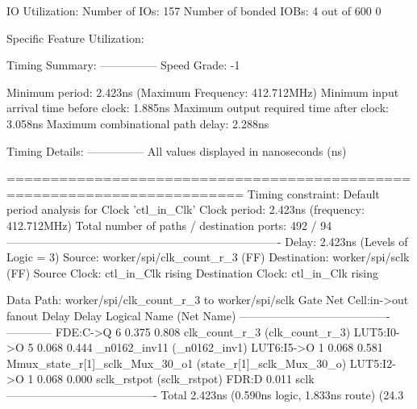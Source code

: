 \documentclass{article}
\begin{document}
IO Utilization: 
 Number of IOs:                         157
 Number of bonded IOBs:                   4  out of    600     0%

Specific Feature Utilization:

\fi
\iffalse
Timing Summary:
---------------
Speed Grade: -1

   Minimum period: 2.423ns (Maximum Frequency: 412.712MHz)
   Minimum input arrival time before clock: 1.885ns
   Maximum output required time after clock: 3.058ns
   Maximum combinational path delay: 2.288ns

Timing Details:
---------------
All values displayed in nanoseconds (ns)

=========================================================================
Timing constraint: Default period analysis for Clock 'ctl_in_Clk'
  Clock period: 2.423ns (frequency: 412.712MHz)
  Total number of paths / destination ports: 492 / 94
-------------------------------------------------------------------------
Delay:               2.423ns (Levels of Logic = 3)
  Source:            worker/spi/clk_count_r_3 (FF)
  Destination:       worker/spi/sclk (FF)
  Source Clock:      ctl_in_Clk rising
  Destination Clock: ctl_in_Clk rising

  Data Path: worker/spi/clk_count_r_3 to worker/spi/sclk
                                Gate     Net
    Cell:in->out      fanout   Delay   Delay  Logical Name (Net Name)
    ----------------------------------------  ------------
     FDE:C->Q              6   0.375   0.808  clk_count_r_3 (clk_count_r_3)
     LUT5:I0->O            5   0.068   0.444  _n0162_inv11 (_n0162_inv1)
     LUT6:I5->O            1   0.068   0.581  Mmux_state_r[1]_sclk_Mux_30_o1 (state_r[1]_sclk_Mux_30_o)
     LUT5:I2->O            1   0.068   0.000  sclk_rstpot (sclk_rstpot)
     FDR:D                     0.011          sclk
    ----------------------------------------
    Total                      2.423ns (0.590ns logic, 1.833ns route)
                                       (24.3%
\end{document}
